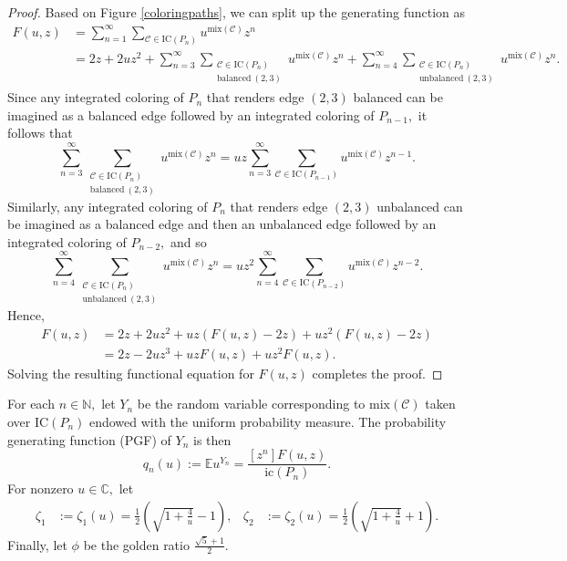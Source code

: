 \documentclass[11pt, reqno]{amsart}
\theoremstyle{definition}
\begin{document}
\begin{proof}
Based on Figure \ref{coloringpaths}, we can split up the generating function as
\begin{align}
F(u, z) &= \sum_{n = 1}^{\infty}\sum_{\mathcal{C} \in \text{IC}(P_n)} u^{\text{mix}(\mathcal{C})}z^n
\\ &=2z + 2uz^2 + \sum_{n = 3}^{\infty}\sum_{\substack{\mathcal{C} \in \text{IC}(P_n) \\ \text{balanced}\ (2,3)}} u^{\text{mix}(\mathcal{C})}z^n + \sum_{n = 4}^{\infty}\sum_{\substack{\mathcal{C} \in \text{IC}(P_n) \\ \text{unbalanced}\ (2,3)}} u^{\text{mix}(\mathcal{C})}z^n.
\end{align}
Since any integrated coloring of $P_n$ that renders edge $(2,3)$ balanced can be imagined as a balanced edge followed by an integrated coloring of $P_{n-1},$ it follows that
\begin{equation}
    \sum_{n = 3}^{\infty}\sum_{\substack{\mathcal{C} \in \text{IC}(P_n) \\ \text{balanced}\ (2,3)}} u^{\text{mix}(\mathcal{C})}z^n = uz\sum_{n = 3}^{\infty}\sum_{\mathcal{C} \in \text{IC}(P_{n-1})} u^{\text{mix}(\mathcal{C})}z^{n-1}.
\end{equation}
Similarly, any integrated coloring of $P_n$ that renders edge $(2,3)$ unbalanced can be imagined as a balanced edge and then an unbalanced edge followed by an integrated coloring of $P_{n-2},$ and so
\begin{equation}
\sum_{n = 4}^{\infty}\sum_{\substack{\mathcal{C} \in \text{IC}(P_n) \\ \text{unbalanced}\ (2,3)}} u^{\text{mix}(\mathcal{C})}z^n = uz^2\sum_{n = 4}^{\infty}\sum_{\mathcal{C} \in \text{IC}(P_{n-2})} u^{\text{mix}(\mathcal{C})}z^{n-2}.
\end{equation}
Hence,
\begin{align}
F(u,z) &= 2z + 2uz^2 + uz(F(u,z)-2z) + uz^2(F(u,z) - 2z)
\\ &= 2z - 2uz^3 + uzF(u,z) + uz^2F(u,z).
\end{align}
Solving the resulting functional equation for $F(u,z)$ completes the proof.
\end{proof}

For each $n \in \mathbb{N},$ let $Y_n$ be the random variable corresponding to $\text{mix}(\mathcal{C})$ taken over $\text{IC}(P_n)$ endowed with the uniform probability measure. The probability generating function (PGF) of $Y_n$ is then
\begin{equation}
q_n(u) := \mathbb{E}u^{Y_n} = \frac{[z^n]F(u,z)}{\text{ic}(P_n)}.
\end{equation}
For nonzero $u \in \mathbb{C},$ let
\begin{align*}
    \zeta_1 &:= \zeta_1(u) = \frac{1}{2}\left(\sqrt{1+\frac{4}{u}} - 1\right), &\zeta_2 &:= \zeta_2(u) = \frac{1}{2}\left(\sqrt{1+\frac{4}{u}} + 1\right).
\end{align*}
Finally, let $\phi$ be the golden ratio $\frac{\sqrt{5}+1}{2}.$
\end{document}
